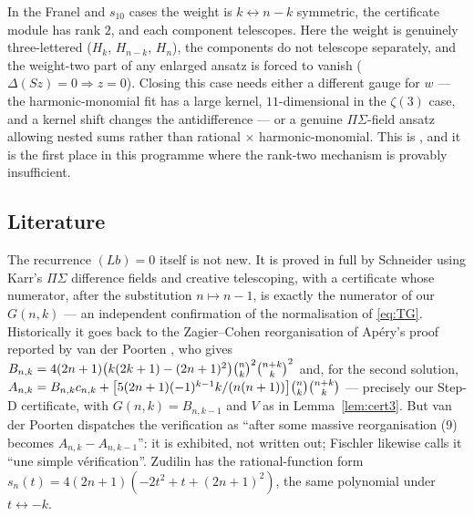 \begin{remark}[diagnosis]\label{rem:diagnosis}
In the Franel and $s_{10}$ cases the weight is $k\leftrightarrow n-k$ symmetric, the
certificate module has rank $2$, and each component telescopes. Here the weight is
genuinely three-lettered ($H_k$, $H_{n-k}$, $H_n$), the components do not telescope
separately, and the weight-two part of any enlarged ansatz is forced to vanish
($\Delta(Sz)=0\Rightarrow z=0$). Closing this case needs either a different gauge for $w$
--- the harmonic-monomial fit has a large kernel, $11$-dimensional in the $\zeta(3)$ case,
and a kernel shift changes the antidifference --- or a genuine $\Pi\Sigma$-field ansatz
allowing nested sums rather than rational $\times$ harmonic-monomial. This is \Open, and
it is the first place in this programme where the rank-two mechanism is provably
insufficient.
\end{remark}

\subsection{Literature}
\label{ssec:minlit}

The recurrence $(Lb)=0$ itself is not new. It is proved in full by Schneider
\cite{Schneider2007} using Karr's $\Pi\Sigma$ difference fields and creative
telescoping, with a certificate whose numerator, after the substitution $n\mapsto n-1$,
is exactly the numerator of our $G(n,k)$ --- an independent confirmation of the
normalisation of \eqref{eq:TG}. Historically it goes back to the Zagier--Cohen
reorganisation of Ap\'ery's proof reported by van der Poorten
\cite[\S8]{vdPoorten1979}, who gives
$B_{n,k}=4(2n+1)\bigl(k(2k+1)-(2n+1)^2\bigr)\binom{n}{k}^2\binom{n+k}{k}^2$ and, for the second
solution, $A_{n,k}=B_{n,k}c_{n,k}+\bigl[5(2n+1)(-1)^{k-1}k/(n(n+1))\bigr]\binom{n}{k}\binom{n+k}{k}$
--- precisely our Step-D certificate, with $G(n,k)=B_{n,k-1}$ and $V$ as in
Lemma~\ref{lem:cert3}. But van der Poorten dispatches the verification as ``after some
massive reorganisation (9) becomes $A_{n,k}-A_{n,k-1}$'': it is exhibited, not written
out; Fischler \cite[\S1.2]{Fischler2004} likewise calls it ``une simple
v\'erification''. Zudilin \cite[eqs.~(5)--(6)]{Zudilin0202159} has the rational-function
form $s_n(t)=4(2n+1)(-2t^2+t+(2n+1)^2)$, the same polynomial under $t\leftrightarrow-k$.

